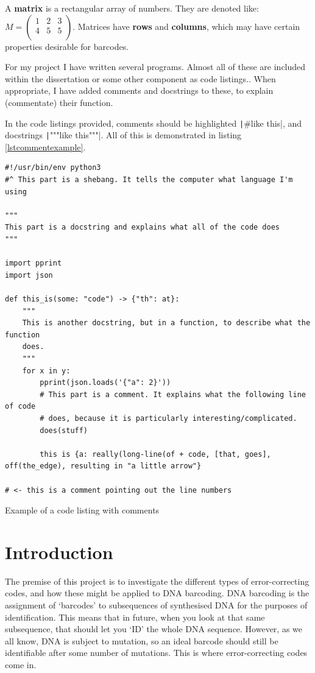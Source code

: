 \documentclass[a4paper,11pt]{article}
\newenvironment{longlisting}
{\addvspace{\baselineskip}\captionsetup{type=listing}}
{\addvspace{\baselineskip}}
\begin{document}
    \begin{definition}
    A \textbf{matrix} is a rectangular array of numbers. They are denoted like:
    \begin{math}
    M =
    \begin{pmatrix}
    1 & 2 & 3 \\
    4 & 5 & 5 \\
    \end{pmatrix}
    \end{math}.
    Matrices have \textbf{rows} and \textbf{columns}, which may have certain
    properties desirable for barcodes.
    \end{definition}

    For my project I have written several programs. Almost all of these are included
    within the dissertation or some other component as code listings.. When
    appropriate, I have added comments and docstrings to these, to explain
    (commentate) their function.

    In the code listings provided, comments should be highlighted
    \texttt|#like this|, and docstrings
    \texttt|"""like this"""|. All of this is demonstrated in listing
    \ref{lstcommentexample}.

\begin{longlisting}
\begin{verbatim}
#!/usr/bin/env python3
#^ This part is a shebang. It tells the computer what language I'm using

"""
This part is a docstring and explains what all of the code does
"""

import pprint
import json

def this_is(some: "code") -> {"th": at}:
    """
    This is another docstring, but in a function, to describe what the function
    does.
    """
    for x in y:
        pprint(json.loads('{"a": 2}'))
        # This part is a comment. It explains what the following line of code
        # does, because it is particularly interesting/complicated.
        does(stuff)

        this is {a: really(long-line(of + code, [that, goes], off(the_edge), resulting in "a little arrow"}

# <- this is a comment pointing out the line numbers
\end{verbatim}
\caption{Example of a code listing with comments}\label{lstcommentexample}
\end{longlisting}

    \section{Introduction}
    The premise of this project is to investigate the different types of
    error-correcting codes, and how these might be applied to DNA barcoding. DNA
    barcoding is the assignment of `barcodes' to subsequences of synthesised DNA
    for the purposes of identification. This means that in future, when you look
    at that same subsequence, that should let you `ID' the whole DNA sequence.
    However, as we all know, DNA is subject to mutation, so an ideal barcode
    should still be identifiable after some number of mutations. This is where
    error-correcting codes come in.
\end{document}
